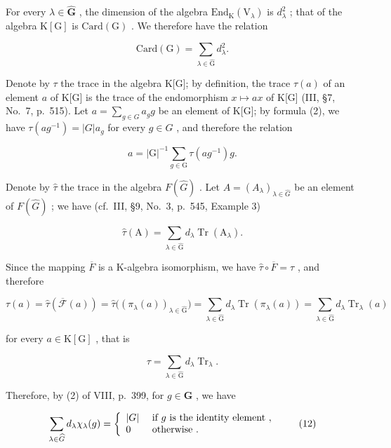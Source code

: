 For every \(\lambda \in \widehat{\mathbf{G}}\) , the dimension of the algebra \(\mathrm{End}_{\mathrm{K}}(\mathrm{V}_{\lambda})\) is \(d_{\lambda}^{2}\) ; that of the algebra \(\mathrm{K}[\mathrm{G}]\) is \(\mathrm{Card}(\mathrm{G})\) . We therefore have the relation

\[
\mathrm{Card(G)} = \sum_ {\lambda \in \widehat {\mathrm{G}}} d _ {\lambda} ^ {2}.\tag{8}
\]

Denote by \(\tau\) the trace in the algebra K{[}G{]}; by definition, the trace \(\tau(a)\) of an element \(a\) of K{[}G{]} is the trace of the endomorphism \(x \mapsto ax\) of K{[}G{]} (III, §7, No.~7, p.~515). Let \(a = \sum_{g \in G} a_g g\) be an element of K{[}G{]}; by formula (2), we have \(\tau(ag^{-1}) = |G| a_g\) for every \(g \in G\) , and therefore the relation

\[
a = | \mathrm{G} | ^ {- 1} \sum_ {g \in \mathrm{G}} \tau (a g ^ {- 1}) g.\tag{9}
\]

Denote by \(\widehat{\tau}\) the trace in the algebra \(F(\widehat{G})\) . Let \(A = (A_{\lambda})_{\lambda \in \widehat{G}}\) be an element of \(F(\widehat{G})\) ; we have (cf.~III, §9, No.~3, p.~545, Example 3)

\[
\widehat {\tau} (\mathrm{A}) = \sum_ {\lambda \in \widehat {\mathrm{G}}} d _ {\lambda} \operatorname{Tr} (\mathrm{A} _ {\lambda}).\tag{10}
\]

Since the mapping \(\overline{F}\) is a K-algebra isomorphism, we have \(\widehat{\tau}\circ\overline{F}=\tau\) , and therefore

\[
\tau (a) = \widehat {\tau} (\overline {{\mathcal {F}}} (a)) = \widehat {\tau} \big ((\pi_ {\lambda} (a)) _ {\lambda \in \widehat {\mathrm{G}}} \big) = \sum_ {\lambda \in \widehat {\mathrm{G}}} d _ {\lambda} \operatorname{Tr} (\pi_ {\lambda} (a)) = \sum_ {\lambda \in \widehat {\mathrm{G}}} d _ {\lambda} \operatorname{Tr} _ {\lambda} (a)
\]

for every \(a\in \mathrm{K}[\mathrm{G}]\) , that is

\[
\tau = \sum_ {\lambda \in \widehat {\mathrm{G}}} d _ {\lambda} \operatorname{Tr} _ {\lambda}.\tag{11}
\]

Therefore, by (2) of VIII, p.~399, for \(g \in \mathbf{G}\) , we have

\[
\sum_ {\lambda \in \widehat {G}} d _ {\lambda}   \chi_ {\lambda} (g) = \left\{ \begin{array}{l l} | G | & \text { if   } g \text {   is   the   identity   element }, \\ 0 & \text { otherwise }. \end{array} \right.\tag{12}
\]

